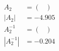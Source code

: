 
\begin{align}
A_2 & = 
\begin{pmatrix}

\end{pmatrix} \\
|A_2| & = -4.905 \\
A_2^{-1} & = 
\begin{pmatrix}

\end{pmatrix} \\
|A_2^{-1}| & = -0.204
\end{align}
